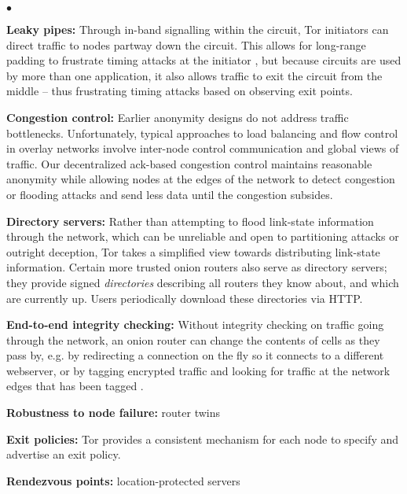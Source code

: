 \documentclass[times,10pt,twocolumn]{article}
\newenvironment{tightlist}{\begin{list}{$\bullet$}{
  \setlength{\itemsep}{0mm}
    \setlength{\parsep}{0mm}
    }}{\end{list}}
\begin{document}
\begin{tightlist}
\item \textbf{Leaky pipes:} Through in-band signalling within the circuit,
Tor initiators can direct traffic to nodes partway down the circuit. This
allows for long-range padding to frustrate timing attacks at the initiator
\cite{defensive-dropping}, but because circuits are used by more than
one application, it also allows traffic to exit the circuit from the
middle -- thus frustrating timing attacks based on observing exit points.

\item \textbf{Congestion control:} Earlier anonymity designs do not
address traffic bottlenecks. Unfortunately, typical approaches to load
balancing and flow control in overlay networks involve inter-node control
communication and global views of traffic. Our decentralized ack-based
congestion control maintains reasonable anonymity while allowing nodes
at the edges of the network to detect congestion or flooding attacks
and send less data until the congestion subsides.

\item \textbf{Directory servers:} Rather than attempting to flood
link-state information through the network, which can be unreliable and
open to partitioning attacks or outright deception, Tor takes a simplified
view towards distributing link-state information. Certain more trusted
onion routers also serve as directory servers; they provide signed
\emph{directories} describing all routers they know about, and which
are currently up. Users periodically download these directories via HTTP.

\item \textbf{End-to-end integrity checking:} Without integrity checking
on traffic going through the network, an onion router can change the
contents of cells as they pass by, e.g. by redirecting a connection on
the fly so it connects to a different webserver, or by tagging encrypted
traffic and looking for traffic at the network edges that has been
tagged \cite{minion-design}.

\item \textbf{Robustness to node failure:} router twins

\item \textbf{Exit policies:}
Tor provides a consistent mechanism for each node to specify and
advertise an exit policy.

\item \textbf{Rendezvous points:}
location-protected servers

\end{tightlist}
\end{document}
